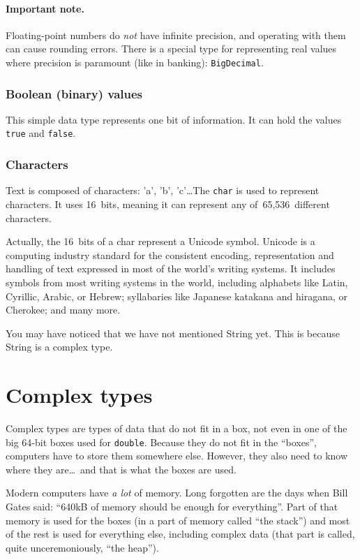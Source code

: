 \paragraph{Important note.} 

Floating-point numbers do \emph{not} have infinite precision, and
operating with them can cause rounding errors. There is a special type
for representing real values where precision is paramount (like in
banking): \verb+BigDecimal+. 

\subsubsection{Boolean (binary) values}
\label{sec:bool-binary-valu}

This simple data type represents one bit of information. It can hold
the values \verb+true+ and \verb+false+. 

\subsubsection{Characters}
\label{sec:characters}

Text is composed of characters: 'a', 'b', 'c'\ldots The \verb+char+ is
used to represent characters. It uses 16~bits, meaning it can
represent any of~65,536~different characters. 

Actually, the 16~bits of a char represent a Unicode symbol. Unicode is
a computing industry standard for the consistent encoding,
representation and handling of text expressed in most of the world's
writing systems. It includes symbols from most writing systems in
the world, including alphabets like Latin, Cyrillic, Arabic, or
Hebrew; syllabaries like Japanese katakana and hiragana, or
Cherokee; and many more. 

You may have noticed that we have not mentioned String yet. This is
because String is a complex type. 

\section{Complex types}
\label{sec:complex-types}

Complex types are types of data that do not fit in a box, not even in
one of the big 64-bit boxes used for \verb+double+. Because they do
not fit in the ``boxes'', computers have to store them somewhere
else. However, they also need to know where they are\ldots~and that is
what the boxes are used. 

Modern computers have \emph{a lot} of memory. Long forgotten are the
days when Bill Gates said: ``640kB of memory should be enough for
everything''. Part of that memory is used for the boxes (in a part of
memory called ``the stack'') and most of the rest is used for
everything else, including complex data (that part is called, quite
unceremoniously, ``the heap''). 


